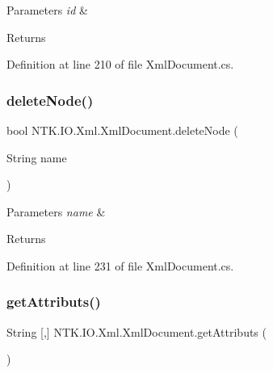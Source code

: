 \begin{DoxyParams}{Parameters}
{\em id} & \\
\hline
\end{DoxyParams}
\begin{DoxyReturn}{Returns}

\end{DoxyReturn}


Definition at line 210 of file Xml\+Document.\+cs.

\mbox{\label{class_n_t_k_1_1_i_o_1_1_xml_1_1_xml_document_af7aa3ff3944180a37e1f4ff94782dab8}} 
\subsubsection{\texorpdfstring{deleteNode()}{deleteNode()}\hspace{0.1cm}{\footnotesize\ttfamily [2/2]}}
{\footnotesize\ttfamily bool N\+T\+K.\+I\+O.\+Xml.\+Xml\+Document.\+delete\+Node (\begin{DoxyParamCaption}\item[{String}]{name }\end{DoxyParamCaption})}






\begin{DoxyParams}{Parameters}
{\em name} & \\
\hline
\end{DoxyParams}
\begin{DoxyReturn}{Returns}

\end{DoxyReturn}


Definition at line 231 of file Xml\+Document.\+cs.

\mbox{\label{class_n_t_k_1_1_i_o_1_1_xml_1_1_xml_document_ae772dda265445df9b1a4bc3259e9dfaa}} 
\subsubsection{\texorpdfstring{getAttributs()}{getAttributs()}}
{\footnotesize\ttfamily String \mbox{[},\mbox{]} N\+T\+K.\+I\+O.\+Xml.\+Xml\+Document.\+get\+Attributs (\begin{DoxyParamCaption}{ }\end{DoxyParamCaption})}





